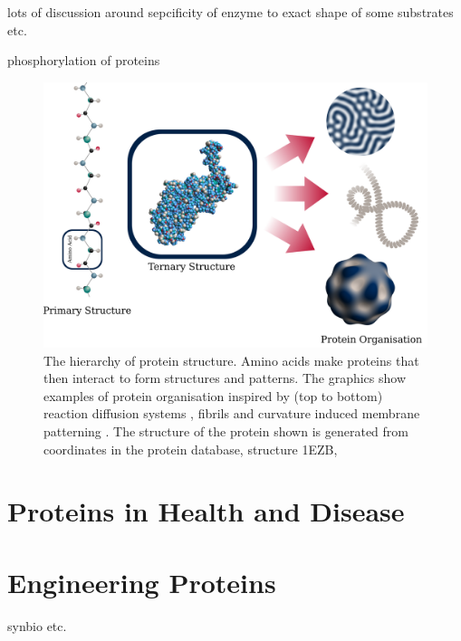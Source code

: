 lots of discussion around sepcificity of enzyme to exact shape of some substrates etc.

phosphorylation of proteins

\begin{figure}
    \centering
    \includegraphics[width=1\textwidth]{figures/proteinLevels.png}
    \caption{The hierarchy of protein structure. Amino acids make proteins that then interact to form structures and patterns. The graphics show examples of protein organisation inspired by (top to bottom) reaction diffusion systems \cite{turing_chemical_1952}, fibrils  and curvature induced membrane patterning \cite{agudo-canalejo_pattern_2017}. The structure of the protein shown is generated from coordinates in the protein database, structure 1EZB, \cite{garrett_solution_1997}}
    \label{fig:1-proteinLevels}
\end{figure}


\section{Proteins in Health and Disease}

\section{Engineering Proteins}

synbio etc.

